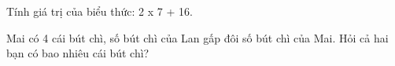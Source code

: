 \begin{ex} %
Tính giá trị của biểu thức: 2 x 7 + 16.
\end{ex}

\begin{ex} %
Mai có 4 cái bút chì, số bút chì của Lan gấp đôi số bút chì của Mai. Hỏi cả hai bạn có bao nhiêu cái bút chì?
\end{ex}
